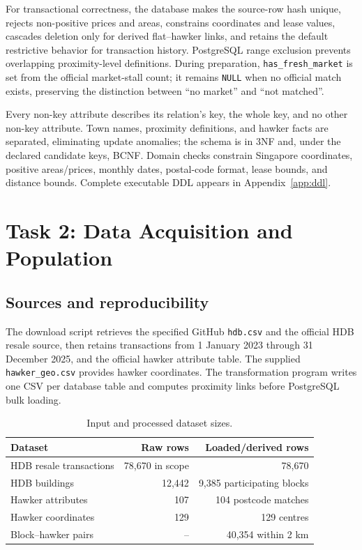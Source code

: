 \documentclass[11pt,a4paper]{article}
\begin{document}
For transactional correctness, the database makes the source-row hash unique, rejects
non-positive prices and areas, constrains coordinates and lease values, cascades deletion
only for derived flat--hawker links, and retains the default restrictive behavior for
transaction history. PostgreSQL range exclusion prevents overlapping proximity-level
definitions. During preparation, \texttt{has\_fresh\_market} is set from the official
market-stall count; it remains \texttt{NULL} when no official match exists, preserving
the distinction between ``no market'' and ``not matched''.

Every non-key attribute describes its relation's key, the whole key, and no other
non-key attribute. Town names, proximity definitions, and hawker facts are separated,
eliminating update anomalies; the schema is in 3NF and, under the declared candidate keys,
BCNF. Domain checks constrain Singapore coordinates, positive areas/prices, monthly dates,
postal-code format, lease bounds, and distance bounds. Complete executable DDL appears in
Appendix~\ref{app:ddl}.

\section{Task 2: Data Acquisition and Population}
\subsection{Sources and reproducibility}
The download script retrieves the specified GitHub \texttt{hdb.csv} and the official HDB resale source,
then retains transactions from 1 January 2023 through 31 December 2025,
and the official hawker attribute table. The supplied
\texttt{hawker\_geo.csv} provides hawker coordinates. The transformation program writes
one CSV per database table and computes proximity links before PostgreSQL bulk loading.

\begin{table}[H]\centering
\caption{Input and processed dataset sizes.}
\begin{tabular}{lrr}\toprule
Dataset & Raw rows & Loaded/derived rows \\\midrule
HDB resale transactions & 78,670 in scope & 78,670 \\
HDB buildings & 12,442 & 9,385 participating blocks \\
Hawker attributes & 107 & 104 postcode matches \\
Hawker coordinates & 129 & 129 centres \\
Block--hawker pairs & -- & 40,354 within 2 km \\
\bottomrule\end{tabular}
\end{table}
\end{document}

